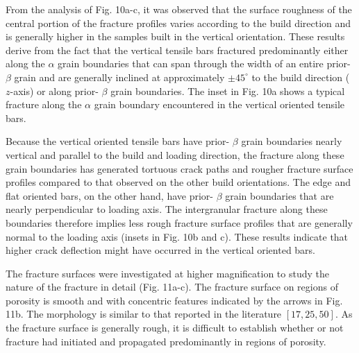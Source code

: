 \documentclass[10pt]{article}
\begin{document}
From the analysis of Fig. 10a-c, it was observed that the surface roughness of the central portion of the fracture profiles varies according to the build direction and is generally higher in the samples built in the vertical orientation. These results derive from the fact that the vertical tensile bars fractured predominantly either along the $\alpha$ grain boundaries that can span through the width of an entire prior- $\beta$ grain and are generally inclined at approximately $\pm 45^{\circ}$ to the build direction ( $z$-axis) or along prior- $\beta$ grain boundaries. The inset in Fig. 10a shows a typical fracture along the $\alpha$ grain boundary encountered in the vertical oriented tensile bars.

Because the vertical oriented tensile bars have prior- $\beta$ grain boundaries nearly vertical and parallel to the build and loading direction, the fracture along these grain boundaries has generated tortuous crack paths and rougher fracture surface profiles compared to that observed on the other build orientations. The edge and flat oriented bars, on the other hand, have prior- $\beta$ grain boundaries that are nearly perpendicular to loading axis. The intergranular fracture along these boundaries therefore implies less rough fracture surface profiles that are generally normal to the loading axis (insets in Fig. 10b and c). These results indicate that higher crack deflection might have occurred in the vertical oriented bars.

The fracture surfaces were investigated at higher magnification to study the nature of the fracture in detail (Fig. 11a-c). The fracture surface on regions of porosity is smooth and with concentric features indicated by the arrows in Fig. 11b. The morphology is similar to that reported in the literature $[17,25,50]$. As the fracture surface is generally rough, it is difficult to establish whether or not fracture had initiated and propagated predominantly in regions of porosity.
\end{document}

